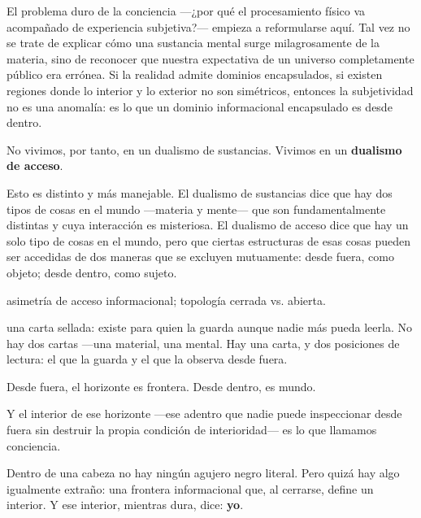 
\noindent El problema duro de la conciencia —¿por qué el procesamiento físico va acompañado de experiencia subjetiva?— empieza a reformularse aquí. Tal vez no se trate de explicar cómo una sustancia mental surge milagrosamente de la materia, sino de reconocer que nuestra expectativa de un universo completamente público era errónea. Si la realidad admite dominios encapsulados, si existen regiones donde lo interior y lo exterior no son simétricos, entonces la subjetividad no es una anomalía: es lo que un dominio informacional encapsulado es desde dentro.

No vivimos, por tanto, en un dualismo de sustancias. Vivimos en un \textbf{dualismo de acceso}.

Esto es distinto y más manejable. El dualismo de sustancias dice que hay dos tipos de cosas en el mundo —materia y mente— que son fundamentalmente distintas y cuya interacción es misteriosa. El dualismo de acceso dice que hay un solo tipo de cosas en el mundo, pero que ciertas estructuras de esas cosas pueden ser accedidas de dos maneras que se excluyen mutuamente: desde fuera, como objeto; desde dentro, como sujeto.

\begin{fisica}
 asimetría de acceso informacional; topología cerrada vs. abierta.

 una carta sellada: existe para quien la guarda aunque nadie más pueda leerla. No hay dos cartas —una material, una mental. Hay una carta, y dos posiciones de lectura: el que la guarda y el que la observa desde fuera.
\end{fisica}

Desde fuera, el horizonte es frontera. Desde dentro, es mundo.

Y el interior de ese horizonte —ese adentro que nadie puede inspeccionar desde fuera sin destruir la propia condición de interioridad— es lo que llamamos conciencia.

Dentro de una cabeza no hay ningún agujero negro literal. Pero quizá hay algo igualmente extraño: una frontera informacional que, al cerrarse, define un interior. Y ese interior, mientras dura, dice: \textbf{yo}.

